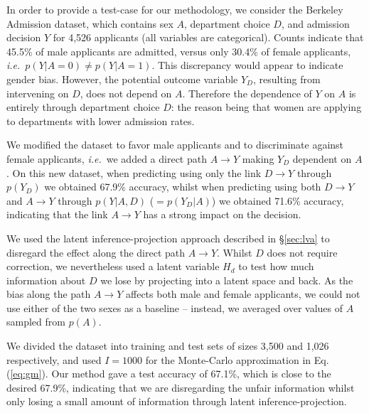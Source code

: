 \documentclass{article}
\newcommand{\secref}[1]{\S \ref{#1}}
\renewcommand{\eqref}[1]{Eq. (\ref{#1})}
\newcommand{\ie}{\emph{i.e.}}
\begin{document}
In order to provide a test-case for our methodology, we consider the Berkeley Admission dataset, which contains sex $A$, department choice $D$, and admission decision $Y$ for 4,526 applicants (all variables are categorical).
Counts indicate that 45.5\% of male applicants are admitted, versus only 30.4\% of female applicants, 
\ie~$p(Y|A=0) \neq p(Y|A=1)$. This discrepancy would appear to indicate gender bias. However, the potential outcome variable $Y_D$, resulting from intervening on $D$, does not depend on $A$.
Therefore the dependence of $Y$ on $A$ is entirely through department choice $D$: the reason being that women are applying to departments with lower admission rates.

We modified the dataset to favor male applicants and to discriminate against female applicants, \ie~we added a direct path $A\rightarrow Y$ making $Y_D$  dependent on $A$.
On this new dataset, when predicting using only the link $D\rightarrow Y$ through $p(Y_D)$ we obtained 67.9\% accuracy, whilst when predicting using both $D\rightarrow Y$
and $A\rightarrow Y$ through $p(Y|A,D)$ ($=p(Y_D|A)$) we obtained 71.6\% accuracy, indicating that the link $A\rightarrow Y$ has a strong impact on the decision.

We used the latent inference-projection approach described in \secref{sec:lva} to disregard the effect along the direct path $A\rightarrow Y$.
Whilst $D$ does not require correction, we nevertheless used a latent variable $H_d$ 
to test how much information about $D$ we lose by projecting into a latent space and back. As the bias along the path $A\rightarrow Y$ 
affects both male and female applicants,  we could not use either of the two sexes as a baseline -- instead, we averaged over values of $A$ sampled from $p(A)$.

We divided the dataset into training and test sets of sizes 3,500 and 1,026 respectively, and used $I=1000$ for the Monte-Carlo approximation in \eqref{eq:gm}.
Our method gave a test accuracy of 67.1\%, which is close to the desired 67.9\%, indicating that we are disregarding the unfair information
whilst only losing a small amount of information through latent inference-projection.
\end{document}
